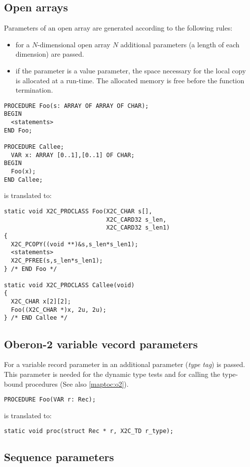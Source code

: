 \subsection{Open arrays}

Parameters of an open array are generated  according to the following
rules:
\begin{itemize}
\item   for a $N$-dimensional open array $N$ additional parameters
        (a length of each dimension) are passed.
\item   if the parameter is a value parameter, the space necessary
        for the local copy is allocated at a run-time. The allocated
        memory is free before the function termination.
\end{itemize}

\begin{verbatim}
PROCEDURE Foo(s: ARRAY OF ARRAY OF CHAR);
BEGIN
  <statements>
END Foo;

PROCEDURE Callee;
  VAR x: ARRAY [0..1],[0..1] OF CHAR;
BEGIN
  Foo(x);
END Callee;
\end{verbatim}
is translated to:
\begin{verbatim}
static void X2C_PROCLASS Foo(X2C_CHAR s[],
                             X2C_CARD32 s_len,
                             X2C_CARD32 s_len1)
{
  X2C_PCOPY((void **)&s,s_len*s_len1);
  <statements>
  X2C_PFREE(s,s_len*s_len1);
} /* END Foo */

static void X2C_PROCLASS Callee(void)
{
  X2C_CHAR x[2][2];
  Foo((X2C_CHAR *)x, 2u, 2u);
} /* END Callee */
\end{verbatim}

\subsection{Oberon-2 variable vecord parameters}\label{maptoc:procdcl:varrec}

For a variable record parameter in \ot{} an additional
parameter ({\em type tag}) is passed. This parameter is
needed for the dynamic type tests and for calling the type-bound
procedures (See also \ref{maptoc:o2}).
\begin{verbatim}
PROCEDURE Foo(VAR r: Rec);
\end{verbatim}
is translated to:
\begin{verbatim}
static void proc(struct Rec * r, X2C_TD r_type);
\end{verbatim}

\subsection{Sequence parameters}\label{maptoc:procdcl:seqrep}

